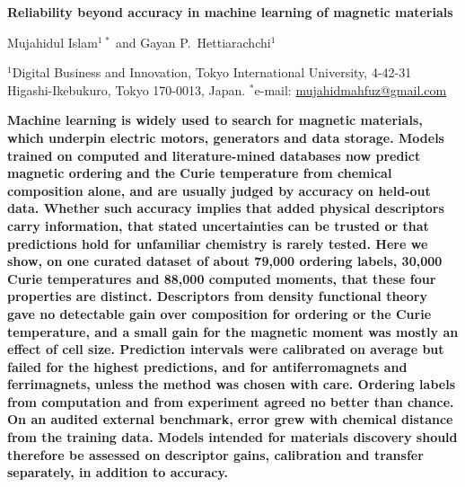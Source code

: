 \documentclass[11pt,a4paper]{article}
\begin{document}
\pagestyle{plain}

\begin{flushleft}
{\sffamily\bfseries\fontsize{19}{23}\selectfont Reliability beyond accuracy in machine learning of magnetic materials\par}
\vspace{12pt}
{\sffamily\large Mujahidul Islam$^{1\,\ast}$ and Gayan P.~Hettiarachchi$^{1}$\par}
\vspace{6pt}
{\sffamily\footnotesize $^{1}$Digital Business and Innovation, Tokyo International University, 4-42-31 Higashi-Ikebukuro, Tokyo 170-0013, Japan.
$^{\ast}$e-mail: \href{mailto:mujahidmahfuz@gmail.com}{mujahidmahfuz@gmail.com}\par}
\end{flushleft}
\vspace{6pt}

{\bfseries\noindent Machine learning is widely used to search for magnetic materials, which underpin electric motors, generators and data storage\cite{gutfleisch2011magnetic,coey2010magnetism}. Models trained on computed and literature-mined databases now predict magnetic ordering and the Curie temperature from chemical composition alone, and are usually judged by accuracy on held-out data\cite{nelson2019curie,long2021ferro,merker2022classifiers,itani2025nemad}. Whether such accuracy implies that added physical descriptors carry information, that stated uncertainties can be trusted or that predictions hold for unfamiliar chemistry is rarely tested\cite{meredig2018extrapolation,tran2020uq,kapoor2023leakage}. Here we show, on one curated dataset of about 79,000 ordering labels, 30,000 Curie temperatures and 88,000 computed moments, that these four properties are distinct. Descriptors from density functional theory gave no detectable gain over composition for ordering or the Curie temperature, and a small gain for the magnetic moment was mostly an effect of cell size. Prediction intervals were calibrated on average but failed for the highest predictions, and for antiferromagnets and ferrimagnets, unless the method was chosen with care. Ordering labels from computation and from experiment agreed no better than chance. On an audited external benchmark, error grew with chemical distance from the training data. Models intended for materials discovery should therefore be assessed on descriptor gains, calibration and transfer separately, in addition to accuracy.\par}
\vspace{8pt}
\end{document}
